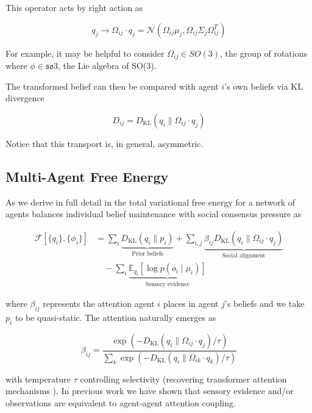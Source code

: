 \documentclass[12pt]{article}
\begin{document}
This operator acts by right action as

\begin{equation}
q_j \to \Omega_{ij} \cdot q_j = \mathcal{N}(\Omega_{ij}\mu_j, \Omega_{ij}\Sigma_j\Omega_{ij}^T)
\end{equation} 

For example, it may be helpful to consider $\Omega_{ij} \in SO(3)$, the group of rotations where $\phi \in \mathfrak{so}3$, the Lie algebra of SO(3).

The transformed belief can then be compared with agent $i$'s own beliefs via KL divergence

\begin{equation}
D_{ij} = D_{\mathrm{KL}}(q_i \| \Omega_{ij} \cdot q_j)
\end{equation}

Notice that this transport is, in general, asymmetric.

\subsection{Multi-Agent Free Energy}

As we derive in full detail in \citet{Dennis2025} the total variational free energy for a network of agents balances individual belief maintenance with social consensus pressure as

\begin{align}
\mathcal{F}[\{q_i\}, \{\phi_i\}] &= \sum_i \underbrace{D_{\mathrm{KL}}(q_i \| p_i)}_{\text{Prior beliefs}} + \sum_{i,j} \underbrace{\beta_{ij} D_{\mathrm{KL}}(q_i \| \Omega_{ij} \cdot q_j)}_{\text{Social alignment}} \\
&\quad - \sum_i \underbrace{\mathbb{E}_{q_i}[\log p(o_i \mid \mu_i)]}_{\text{Sensory evidence}}
\end{align}

where $\beta_{ij}$ represents the attention agent $i$ places in agent $j$'s beliefs and we take $p_i$ to be quasi-static. The attention naturally emerges as

\begin{equation}
\beta_{ij} = \frac{\exp(-D_{\mathrm{KL}}(q_i \| \Omega_{ij} \cdot q_j)/\tau)}{\sum_k \exp(-D_{\mathrm{KL}}(q_i \| \Omega_{ik} \cdot q_k)/\tau)}
\end{equation}

with temperature $\tau$ controlling selectivity (recovering transformer attention mechanisms \citet{Dennis2025}). In previous work we have shown that sensory evidence and/or observations are equivalent to agent-agent attention coupling.\citet{Dennis2025a}
\end{document}
